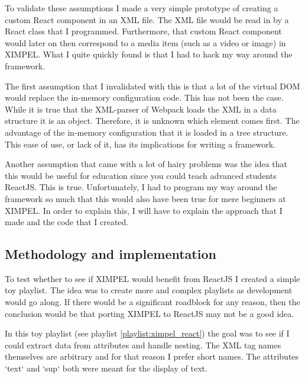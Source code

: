 
To validate these assumptions I made a very simple prototype of creating a custom React component in an XML file. The XML file would be read in by a React class that I programmed. Furthermore, that custom React component would later on then correspond to a media item (such as a video or image) in XIMPEL. What I quite quickly found is that I had to hack my way around the framework. 

The first assumption that I invalidated with this is that a lot of the virtual DOM would replace the in-memory configuration code. This has not been the case. While it is true that the XML-parser of Webpack loads the XML in a data structure it is an object. Therefore, it is unknown which element comes first. The advantage of the in-memory configuration that it is loaded in a tree structure. This ease of use, or lack of it, has its implications for writing a framework.

Another assumption that came with a lot of hairy problems was the idea that this would be useful for education since you could teach advanced students ReactJS. This is true. Unfortunately, I had to program my way around the framework so much that this would also have been true for mere beginners at XIMPEL. In order to explain this, I will have to explain the approach that I made and the code that I created.

\subsection{Methodology and implementation}
To test whether to see if XIMPEL would benefit from ReactJS I created a simple toy playlist. The idea was to create more and complex playlists as development would go along. If there would be a significant roadblock for any reason, then the conclusion would be that porting XIMPEL to ReactJS may not be a good idea.

In this toy playlist (see playlist \ref{playlist:ximpel_react}) the goal was to see if I could extract data from attributes and handle nesting. The XML tag names themselves are arbitrary and for that reason I prefer short names. The attributes `text` and `sup` both were meant for the display of text.

